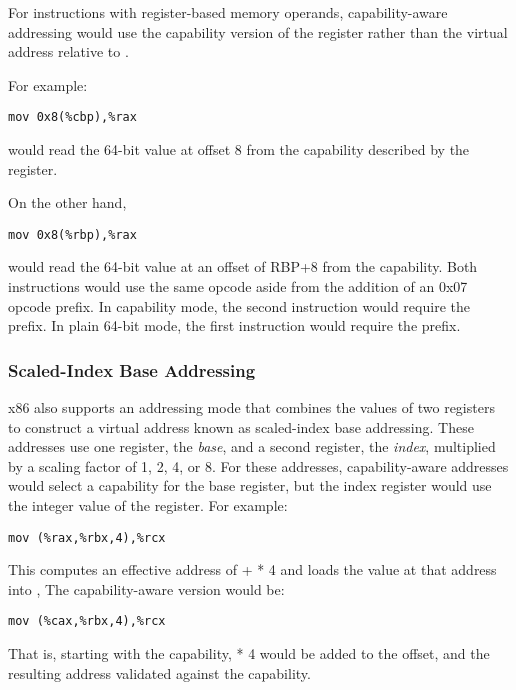 For instructions with register-based memory operands, capability-aware
addressing would use the capability version of the register rather
than the virtual address relative to \DDC{}.

For example:

\begin{verbatim}
mov 0x8(%cbp),%rax
\end{verbatim}

would read the 64-bit value at offset 8 from the capability described
by the \CBP{} register.

On the other hand,

\begin{verbatim}
mov 0x8(%rbp),%rax
\end{verbatim}

would read the 64-bit value at an offset of RBP+8 from the \DDC{} capability.
Both instructions would use the same opcode aside from the addition of
an 0x07 opcode prefix.  In capability mode, the second
instruction would require the prefix.  In plain 64-bit mode,
the first instruction would require the prefix.

\subsubsection{Scaled-Index Base Addressing}

x86 also supports an addressing mode that combines the values of two
registers to construct a virtual address known as scaled-index base
addressing.  These addresses use one register, the \emph{base}, and a
second register, the \emph{index}, multiplied by a scaling factor of 1, 2,
4, or 8.  For these addresses, capability-aware addresses would select
a capability for the base register, but the index register would use
the integer value of the register.  For example:

\begin{verbatim}
mov (%rax,%rbx,4),%rcx
\end{verbatim}

This computes an effective address of \RAX{} + \RBX{} * 4 and loads the value
at that address into \RCX{},  The capability-aware version would be:

\begin{verbatim}
mov (%cax,%rbx,4),%rcx
\end{verbatim}

That is, starting with the \CAX{} capability, \RBX{} * 4 would be added to the
offset, and the resulting address validated against the \CAX{} capability.


